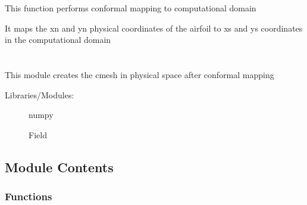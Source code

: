 \documentclass[letterpaper,10pt,english]{sphinxmanual}
\begin{document}
\begin{fulllineitems}
\label{\detokenize{autoapi/geom_func/index:geom_func.geom}}
\sphinxAtStartPar
This function performs conformal mapping to computational domain

\sphinxAtStartPar
It maps the xn and yn physical coordinates of the airfoil to xs and ys
coordinates in the computational domain

\end{fulllineitems}



\section{}
\label{\detokenize{autoapi/mesh_func/index:module-mesh_func}}\label{\detokenize{autoapi/mesh_func/index:mesh-func}}\label{\detokenize{autoapi/mesh_func/index::doc}}
\sphinxAtStartPar
This module creates the c\sphinxhyphen{}mesh in physical space after conformal mapping
\begin{description}
\item[{Libraries/Modules:}] \leavevmode
\sphinxAtStartPar
numpy

\sphinxAtStartPar
Field

\end{description}


\subsection{Module Contents}
\label{\detokenize{autoapi/mesh_func/index:module-contents}}

\subsubsection{Functions}
\label{\detokenize{autoapi/mesh_func/index:functions}}
\end{document}

